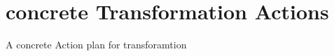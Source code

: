 \section{concrete Transformation Actions}
\label{sec:actionPlan}


A concrete Action plan for transforamtion